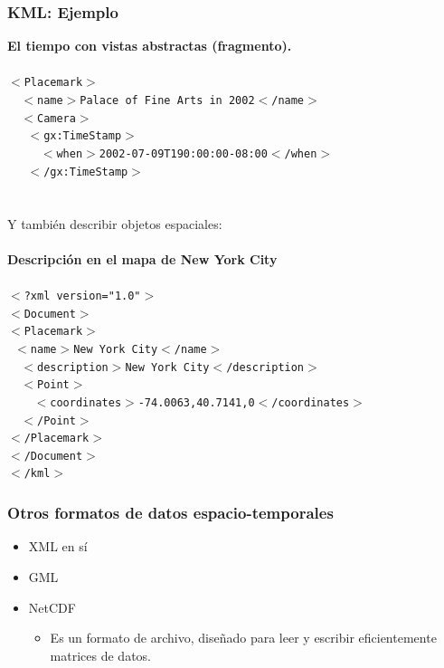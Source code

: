 \documentclass[a4paper,12pt,oneside]{report}
\begin{document}
\subsubsection*{KML: Ejemplo}

\textbf{El tiempo con vistas abstractas (fragmento).}\\
\ \\
\texttt{$<$Placemark$>$\\
\ \ $<$name$>$Palace of Fine Arts in 2002$<$/name$>$\\
\ \ $<$Camera$>$\\
\ \ \ $<$gx:TimeStamp$>$\\
\ \ \ \ \ $<$when$>$2002-07-09T190:00:00-08:00$<$/when$>$ \\
\ \ \ $<$/gx:TimeStamp$>$\\}\\
\ \\
Y tambi\'en describir objetos espaciales:\\
\ \\
\textbf{Descripci\'on en el mapa de New York City}\\
\ \\
\texttt{$<$?xml version="1.0"$>$\\
$<$Document$>$\\
$<$Placemark$>$\\
\  $<$name$>$New York City$<$/name$>$\\
\ \ $<$description$>$New York City$<$/description$>$\\
\ \ $<$Point$>$\\
\ \ \ \ $<$coordinates$>$-74.0063,40.7141,0$<$/coordinates$>$\\
\ \ $<$/Point$>$\\
$<$/Placemark$>$\\
$<$/Document$>$\\
$<$/kml$>$}

\subsubsection*{Otros formatos de datos espacio-temporales}
\begin{itemize}
\item XML en s\'i
\item GML
\item NetCDF
\begin{itemize}
\item Es un formato de archivo, dise\~nado para leer y escribir eficientemente matrices de datos.
\end{itemize}
\end{itemize}



\end{document}
